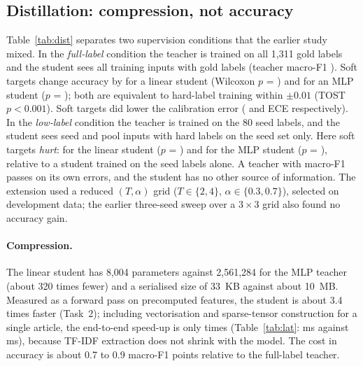 \subsection{Distillation: compression, not accuracy}\label{sec:distill}
Table~\ref{tab:dist} separates two supervision conditions that the earlier study mixed. In the \emph{full-label} condition the teacher is trained on all 1{,}311 gold labels and the student sees all training inputs with gold labels (teacher macro-F1 \dsTeacherFullLinear). Soft targets change accuracy by \dsDiffFullLinear{} for a linear student (Wilcoxon $p$ = \dsPFullLinear) and \dsDiffFullMlp{} for an MLP student ($p$ = \dsPFullMlp); both are equivalent to hard-label training within $\pm0.01$ (TOST $p<0.001$). Soft targets did lower the calibration error (\dsDeceFullLinear{} and \dsDeceFullMlp{} ECE respectively). In the \emph{low-label} condition the teacher is trained on the 80 seed labels, and the student sees seed and pool inputs with hard labels on the seed set only. Here soft targets \emph{hurt}: \dsDiffLowLinear{} for the linear student ($p$ = \dsPLowLinear) and \dsDiffLowMlp{} for the MLP student ($p$ = \dsPLowMlp), relative to a student trained on the seed labels alone. A teacher with macro-F1 \dsTeacherLowLinear{} passes on its own errors, and the student has no other source of information. The extension used a reduced $(T,\alpha)$ grid ($T\in\{2,4\}$, $\alpha\in\{0.3,0.7\}$), selected on development data; the earlier three-seed sweep over a $3\times3$ grid also found no accuracy gain.

\begin{table}[t]
\centering\small
\caption{Distillation extension (\nSeeds{} paired seeds): student macro-F1 with hard labels versus the dev-selected distilled student, paired difference with 95\% CI, Wilcoxon $p$, and change in ECE. ``All gold labels'': teacher and student see all training labels. ``80 labels'': teacher trained on the seed set; students see seed and pool inputs, hard labels only on the seed set.}\label{tab:dist}
\resizebox{\textwidth}{!}{}
\end{table}

\paragraph{Compression.} The linear student has 8{,}004 parameters against 2{,}561{,}284 for the MLP teacher (about 320 times fewer) and a serialised size of 33~KB against about 10~MB. Measured as a forward pass on precomputed features, the student is about 3.4 times faster (Task~2); including vectorisation and sparse-tensor construction for a single article, the end-to-end speed-up is only \latSpeedup{} times (Table~\ref{tab:lat}: \latTeacher{} ms against \latStudent{} ms), because TF-IDF extraction does not shrink with the model. The cost in accuracy is about 0.7 to 0.9 macro-F1 points relative to the full-label teacher.

